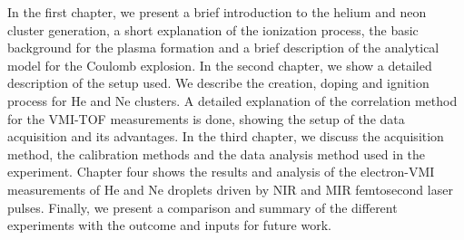 In the first chapter, we present a brief introduction to the helium and neon cluster generation, a short explanation of the ionization process, the basic background for the plasma formation and a brief description of the analytical model for the Coulomb explosion. In the second chapter, we show a detailed description of the setup used. We describe the creation, doping and ignition process for He and Ne clusters. A detailed explanation of the correlation method for the VMI-TOF measurements is done, showing the setup of the data acquisition and its advantages. In the third chapter, we discuss the acquisition method, the calibration methods and the data analysis method used in the experiment. Chapter four shows the results and analysis of the electron-VMI measurements of He and Ne droplets driven by NIR and MIR femtosecond laser pulses. Finally, we present a comparison and summary of the different experiments with the outcome and inputs for future work.




